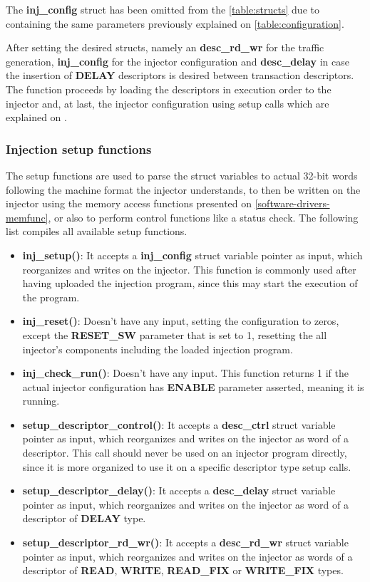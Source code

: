 The \textbf{inj\_config} struct has been omitted from the \autoref{table:structs} due to containing the same parameters previously explained on 
\autoref{table:configuration}.

After setting the desired structs, namely an \textbf{desc\_rd\_wr} for the traffic generation, \textbf{inj\_config} for the injector configuration and 
\textbf{desc\_delay} in case the insertion of \textbf{DELAY} descriptors is desired between transaction descriptors. 
The function proceeds by loading the descriptors in execution order to the injector and, at last, the injector configuration using setup calls which are 
explained on .


\subsubsection{Injection setup functions}
\label{software-drivers-setup}

The setup functions are used to parse the struct variables to actual 32-bit words following the machine format the injector understands, to then be written 
on the injector using the memory access functions presented on \autoref{software-drivers-memfunc}, or also to perform control functions like a status check.
The following list compiles all available setup functions.

\begin{itemize}
  \item \textbf{inj\_setup()}: It accepts a \textbf{inj\_config} struct variable pointer as input, which reorganizes and writes on the injector. This function is commonly used after having uploaded the injection program, since this may start the execution of the program.
  \item \textbf{inj\_reset()}: Doesn't have any input, setting the configuration to zeros, except the \textbf{RESET\_SW} parameter that is set to 1, resetting the all injector's components including the loaded injection program.
  \item \textbf{inj\_check\_run()}: Doesn't have any input. This function returns 1 if the actual injector configuration has \textbf{ENABLE} parameter asserted, meaning it is running.
  \item \textbf{setup\_descriptor\_control()}: It accepts a \textbf{desc\_ctrl} struct variable pointer as input, which reorganizes and writes on the injector as word of a descriptor. This call should never be used on an injector program directly, since it is more organized to use it on a specific descriptor type setup calls.
  \item \textbf{setup\_descriptor\_delay()}: It accepts a \textbf{desc\_delay} struct variable pointer as input, which reorganizes and writes on the injector as word of a descriptor of \textbf{DELAY} type.
  \item \textbf{setup\_descriptor\_rd\_wr()}: It accepts a \textbf{desc\_rd\_wr} struct variable pointer as input, which reorganizes and writes on the injector as words of a descriptor of \textbf{READ}, \textbf{WRITE}, \textbf{READ\_FIX} or \textbf{WRITE\_FIX} types.
\end{itemize}
\vspace{15px}


